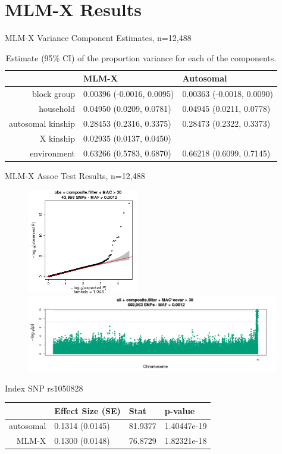 \documentclass{beamer}
\begin{document}
\section{MLM-X Results}
\begin{frame}{MLM-X Variance Component Estimates, n=12,488}
\small
\begin{table}[h!]
\centering
\begin{tabular}{r|l||l}
  \hline
&MLM-X &Autosomal \\ \hline
block group & 0.00396 (-0.0016, 0.0095) & 0.00363 (-0.0018, 0.0090)\\
household &0.04950 (0.0209, 0.0781)& 0.04945  (0.0211, 0.0778)\\
autosomal kinship &0.28453 (0.2316, 0.3375) & 0.28473 (0.2322, 0.3373)\\
X kinship &0.02935 (0.0137, 0.0450) & \\
environment &0.63266 (0.5783, 0.6870) &  0.66218 (0.6099, 0.7145) \\ \hline
\end{tabular}
\caption{Estimate (95\% CI) of the proportion variance for each of the components.}
\label{table:varComp}
\end{table}
\end{frame}

\begin{frame}{MLM-X Assoc Test Results, n=12,488}
\centering
\begin{figure}
\includegraphics[height=4.6cm]{pval_qq_filtered_2015-02-27_11-42-21___316987_v2.png}\\
\includegraphics[width=11cm]{pval_manh_single_2015-02-27_11-42-21___316987_v2.png}
\end{figure}
\end{frame}

\begin{frame}{Index SNP rs1050828}
\begin{table}[ht]
\centering
\begin{tabular}{r|lll}
  \hline
 & Effect Size (SE) & Stat & p-value \\ 
  \hline
autosomal & 0.1314 (0.0145) & 81.9377 & 1.40447e-19 \\ 
MLM-X & 0.1300 (0.0148) & 76.8729 & 1.82321e-18 \\ 
 \hline
\end{tabular}
\end{table}
\end{frame}
\end{document}

